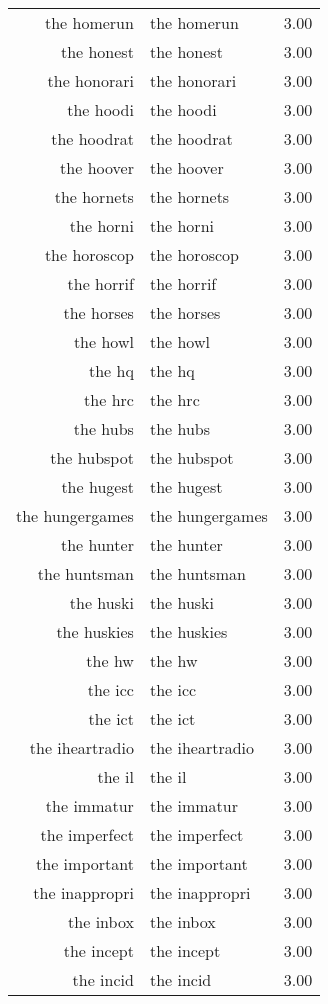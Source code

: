 \begin{table}[ht]
\begin{tabular}{rlr}
  the homerun & the homerun & 3.00 \\ 
  the honest & the honest & 3.00 \\ 
  the honorari & the honorari & 3.00 \\ 
  the hoodi & the hoodi & 3.00 \\ 
  the hoodrat & the hoodrat & 3.00 \\ 
  the hoover & the hoover & 3.00 \\ 
  the hornets & the hornets & 3.00 \\ 
  the horni & the horni & 3.00 \\ 
  the horoscop & the horoscop & 3.00 \\ 
  the horrif & the horrif & 3.00 \\ 
  the horses & the horses & 3.00 \\ 
  the howl & the howl & 3.00 \\ 
  the hq & the hq & 3.00 \\ 
  the hrc & the hrc & 3.00 \\ 
  the hubs & the hubs & 3.00 \\ 
  the hubspot & the hubspot & 3.00 \\ 
  the hugest & the hugest & 3.00 \\ 
  the hungergames & the hungergames & 3.00 \\ 
  the hunter & the hunter & 3.00 \\ 
  the huntsman & the huntsman & 3.00 \\ 
  the huski & the huski & 3.00 \\ 
  the huskies & the huskies & 3.00 \\ 
  the hw & the hw & 3.00 \\ 
  the icc & the icc & 3.00 \\ 
  the ict & the ict & 3.00 \\ 
  the iheartradio & the iheartradio & 3.00 \\ 
  the il & the il & 3.00 \\ 
  the immatur & the immatur & 3.00 \\ 
  the imperfect & the imperfect & 3.00 \\ 
  the important & the important & 3.00 \\ 
  the inappropri & the inappropri & 3.00 \\ 
  the inbox & the inbox & 3.00 \\ 
  the incept & the incept & 3.00 \\ 
  the incid & the incid & 3.00 \\ 

\end{tabular}
\end{table}

